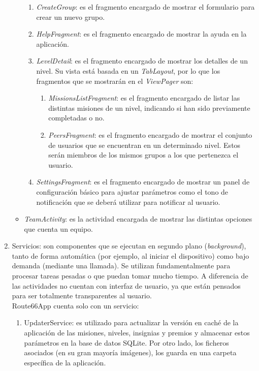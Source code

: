 \documentclass[twoside]{report}
\begin{document}
\begin{enumerate}
\begin{itemize}
	\begin{enumerate}
		\item \textit{CreateGroup}: es el fragmento encargado de mostrar el formulario para crear un nuevo grupo.
		\item \textit{HelpFragment}: es el fragmento encargado de mostrar la ayuda en la aplicación.
		\item \textit{LevelDetail}: es el fragmento encargado de mostrar los detalles de un nivel. Su vista está basada en un \textit{TabLayout}, por lo que los fragmentos que se mostrarán en el \textit{ViewPager} son:
		\begin{enumerate}
		\item \textit{MissionsListFragment}: es el fragmento encargado de listar las distintas misiones de un nivel, indicando si han sido previamente completadas o no.
		\item \textit{PeersFragment}: es el fragmento encargado de mostrar el conjunto de usuarios que se encuentran en un determinado nivel. Estos serán miembros de los mismos grupos a los que pertenezca el usuario.
		\end{enumerate}
		\item \textit{SettingsFragment}: es el fragmento encargado de mostrar un panel de configuración básico para ajustar parámetros como el tono de notificación que se deberá utilizar para notificar al usuario.
	\end{enumerate}
	\item \textit{TeamActivity}: es la actividad encargada de mostrar las distintas opciones que cuenta un equipo.
	\end{itemize}

\item Servicios: son componentes que se ejecutan en segundo plano (\textit{background}), tanto de forma automática (por ejemplo, al iniciar el dispositivo) como bajo demanda (mediante una llamada). Se utilizan fundamentalmente para procesar tareas pesadas o que puedan tomar mucho tiempo. A diferencia de las actividades no cuentan con interfaz de usuario, ya que están pensados para ser totalmente transparentes al usuario.\\
Route66App cuenta solo con un servicio:
	\begin{enumerate}
	\item UpdaterService: es utilizado para actualizar la versión en caché de la aplicación de las misiones, niveles, insignias y premios y almacenar estos parámetros en la base de datos SQLite. Por otro lado, los ficheros asociados (en su gran mayoría imágenes), los guarda en una carpeta específica de la aplicación.
	

\end{enumerate}
\end{enumerate}
\end{document}
